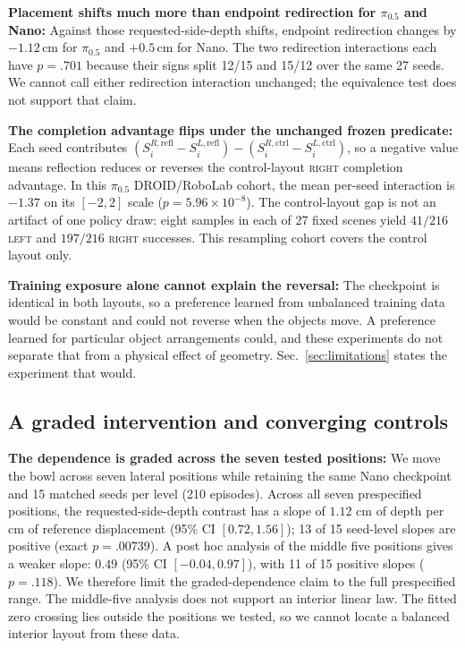 \documentclass[letterpaper,10pt,conference]{ieeeconf}%
\newcommand{\tokL}{\textsc{left}}
\newcommand{\tokR}{\textsc{right}}
\newcommand{\tightparagraph}[1]{\vspace{0.25em}\noindent\textbf{#1}}
\begin{document}
\tightparagraph{Placement shifts much more than endpoint redirection for $\pi_{0.5}$ and Nano:}
Against those requested-side-depth shifts, endpoint redirection changes by $-1.12$\,cm for $\pi_{0.5}$ and $+0.5$\,cm for Nano.
The two redirection interactions each have $p=.701$ because their signs split 12/15 and 15/12 over the same 27 seeds.
We cannot call either redirection interaction unchanged; the equivalence test does not support that claim.

\tightparagraph{The completion advantage flips under the unchanged frozen predicate:}
Each seed contributes $(S_i^{R,\mathrm{refl}}-S_i^{L,\mathrm{refl}})-(S_i^{R,\mathrm{ctrl}}-S_i^{L,\mathrm{ctrl}})$, so a negative value means reflection reduces or reverses the control-layout \tokR{} completion advantage.
In this $\pi_{0.5}$ DROID/RoboLab cohort, the mean per-seed interaction is $-1.37$ on its $[-2,2]$ scale ($p=5.96\times10^{-8}$).
The control-layout gap is not an artifact of one policy draw: eight samples in each of 27 fixed scenes yield $41/216$ \tokL{} and $197/216$ \tokR{} successes.
This resampling cohort covers the control layout only.

\tightparagraph{Training exposure alone cannot explain the reversal:}
The checkpoint is identical in both layouts, so a preference learned from unbalanced training data would be constant and could not reverse when the objects move.
A preference learned for particular object arrangements could, and these experiments do not separate that from a physical effect of geometry.
Sec.~\ref{sec:limitations} states the experiment that would.

\subsection{A graded intervention and converging controls}
\label{sec:graded}

\tightparagraph{The dependence is graded across the seven tested positions:}
We move the bowl across seven lateral positions while retaining the same Nano checkpoint and 15 matched seeds per level (210 episodes).
Across all seven prespecified positions, the requested-side-depth contrast has a slope of $1.12$ cm of depth per cm of reference displacement (95\% CI $[0.72,1.56]$); 13 of 15 seed-level slopes are positive (exact $p=.00739$).
A post hoc analysis of the middle five positions gives a weaker slope: $0.49$ (95\% CI $[-0.04,0.97]$), with 11 of 15 positive slopes ($p=.118$).
We therefore limit the graded-dependence claim to the full prespecified range.
The middle-five analysis does not support an interior linear law.
The fitted zero crossing lies outside the positions we tested, so we cannot locate a balanced interior layout from these data.
\end{document}
